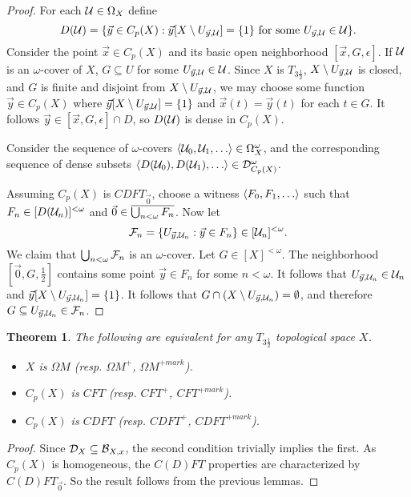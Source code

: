 \documentclass{amsart}
\theoremstyle{plain}
\newtheorem{theorem}{Theorem}
\theoremstyle{definition}
\theoremstyle{remark}
\theoremstyle{plain}
\theoremstyle{definition}
\theoremstyle{remark}
\begin{document}
\begin{proof}
  For each \(\mathcal{U}\in\Omega_{X}\) define
  \[
    D(\mathcal{U})
      =
    \{
      \vec y\in C_p(X)
    :
      \vec y[X\setminus U_{\vec y,\mathcal{U}}]=\{1\}
      \text{ for some }
      U_{\vec y,\mathcal{U}}\in\mathcal{U}
    \}
  .\]
  Consider the point \(\vec x\in C_p(X)\) and its basic open neighborhood
  \([\vec x,G,\epsilon]\). If \(\mathcal{U}\) is an \(\omega\)-cover
  of \(X\), \(G\subseteq U\) for some \(U_{\vec y,\mathcal{U}}\in\mathcal{U}\).
  Since \(X\) is
  \(T_{3\frac{1}{2}}\), \(X\setminus U_{\vec y,\mathcal{U}}\) is closed, and \(G\)
  is finite and disjoint from \(X\setminus U_{\vec y,\mathcal{U}}\),
  we may choose some function \(\vec y\in C_p(X)\) where
  \(\vec y[X\setminus U_{\vec y,\mathcal{U}}]=\{1\}\) and \(\vec x(t)=\vec y(t)\)
  for each \(t\in G\).
  It follows \(\vec y\in [\vec x,G,\epsilon]\cap D\), so \(D(\mathcal{U})\)
  is dense in \(C_p(X)\).

  Consider the sequence of \(\omega\)-covers
  \(\<\mc U_0,\mc U_1,\dots\>\in\Omega_X^\omega\), and the
  corresponding sequence of dense subsets
  \(\<D(\mc U_0),D(\mc U_1),\dots\>\in\mc D_{C_p(X)}^\omega\).

  Assuming \(C_p(X)\) is \(CDFT_{\vec 0}\), choose a witness
  \(\<F_0,F_1,\dots\>\) such that \(F_n\in[D(\mathcal{U}_n)]^{<\omega}\)
  and \(\vec 0 \in \overline{\bigcup_{n<\omega} F_n}\). Now let
  \[
    \mathcal{F}_n
      =
    \{
      U_{\vec y,\mathcal{U}_n}
    :
      \vec y \in F_n
    \}
      \in
    [\mathcal{U}_n]^{<\omega}
  .\]
  We claim that \(\bigcup_{n<\omega}\mathcal{F}_n\) is an \(\omega\)-cover.
  Let \(G\in[X]^{<\omega}\). The neighborhood \([\vec 0,G,\frac{1}{2}]\)
  contains some point \(\vec y\in F_n\) for some \(n<\omega\). It follows
  that \(U_{\vec y,\mathcal{U}_n}\in\mathcal{U}_n\) and
  \(\vec y[X\setminus U_{\vec y,\mathcal{U}_n}]=\{1\}\). It follows that
  \(G\cap(X\setminus U_{\vec y,\mathcal{U}_n})=\emptyset\), and therefore
  \(G\subseteq U_{\vec y,\mathcal{U}_n}\in\mathcal{F}_n\).
\end{proof}

\begin{theorem}
  The following are equivalent for any \(T_{3\frac{1}{2}}\)
  topological space \(X\).
    \begin{itemize}
      \item \(X\) is \(\Omega M\)
            (resp. \(\Omega M^+\), \(\Omega M^{+mark}\)).
      \item \(C_p(X)\) is \(CFT\)
            (resp. \(CFT^+\), \(CFT^{+mark}\)).
      \item \(C_p(X)\) is \(CDFT\)
            (resp. \(CDFT^+\), \(CDFT^{+mark}\)).
    \end{itemize}
\end{theorem}

\begin{proof}
  Since \(\mathcal{D}_X\subseteq \mathcal{B}_{X,x}\), the second condition trivially
  implies the first. As \(C_p(X)\) is homogeneous, the \(C(D)FT\) properties
  are characterized by \(C(D)FT_{\vec 0}\). So the result follows from the
  previous lemmas.
\end{proof}




\end{document}
